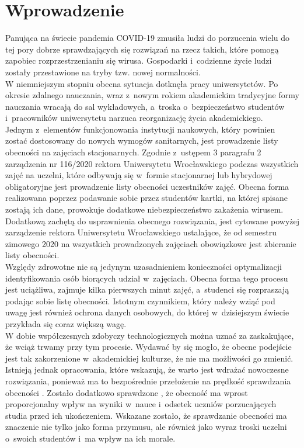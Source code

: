 \documentclass[declaration,shortabstract, mgr]{iithesis}
\author {Dawid Szczyrk}
\begin{document}
\chapter{Wprowadzenie}

\indent Panująca na świecie pandemia COVID-19 zmusiła ludzi do porzucenia wielu do tej pory dobrze sprawdzających się rozwiązań na rzecz takich, które pomogą zapobiec rozprzestrzenianiu się wirusa. Gospodarki i~codzienne życie ludzi zostały przestawione na tryby tzw. nowej normalności.\\
\indent W niemniejszym stopniu obecna sytuacja dotknęła pracy uniwersytetów. Po okresie zdalnego nauczania, wraz z~nowym rokiem akademickim tradycyjne formy nauczania wracają do sal wykładowych, a~troska o~bezpieczeństwo studentów i~pracowników uniwersytetu narzuca reorganizację życia akademickiego.\\
\indent Jednym z~elementów funkcjonowania instytucji naukowych, który powinien zostać dostosowany do nowych wymogów sanitarnych, jest prowadzenie listy obecności na zajęciach stacjonarnych. Zgodnie z~ustępem 3 paragrafu 2 zarządzenia nr 116/2020 rektora Uniwersytetu Wrocławskiego \cite{uwr} podczas wszystkich zajęć na uczelni, które odbywają się w~formie stacjonarnej lub hybrydowej obligatoryjne jest prowadzenie listy obecności uczestników zajęć. Obecna forma realizowana poprzez podawanie sobie przez studentów kartki, na której spisane zostają ich dane, prowokuje dodatkowe niebezpieczeństwo zakażenia wirusem. \\
\indent Dodatkową zachętą do usprawnienia obecnego rozwiązania, jest cytowane powyżej zarządzenie rektora Uniwersytetu Wrocławskiego ustalające, że od semestru zimowego 2020 na wszystkich prowadzonych zajęciach obowiązkowe jest zbieranie listy obecności. \\
\indent Względy zdrowotne nie są jedynym uzasadnieniem konieczności optymalizacji identyfikowania osób biorących udział w~zajęciach. Obecna forma tego procesu jest uciążliwa, zajmuje kilka pierwszych minut zajęć, a~studenci się rozpraszają podając sobie listę obecności. Istotnym czynnikiem, który należy wziąć pod uwagę jest również ochrona danych osobowych, do której w~dzisiejszym świecie przykłada się coraz większą wagę.\\
\indent W dobie współczesnych zdobyczy technologicznych można uznać za zaskakujące, że wciąż trwamy przy tym procesie. Wydawać by się mogło, że obecne podejście jest tak zakorzenione w~akademickiej kulturze, że nie ma możliwości go zmienić. Istnieją jednak opracowania, które wskazują, że warto jest wdrażać nowoczesne rozwiązania, ponieważ ma to bezpośrednie przełożenie na prędkość sprawdzania obecności \cite{lcd}. Zostało dodatkowo sprawdzone \cite{theory_base}, że obecność ma wprost proporcjonalny wpływ na wyniki w~nauce i~odsetek uczniów porzucających studia przed ich ukończeniem. Wskazane zostało, że sprawdzanie obecności ma znaczenie nie tylko jako forma przymusu, ale również jako wyraz troski uczelni o~swoich studentów i~ma wpływ na ich morale.\\
\end{document}
